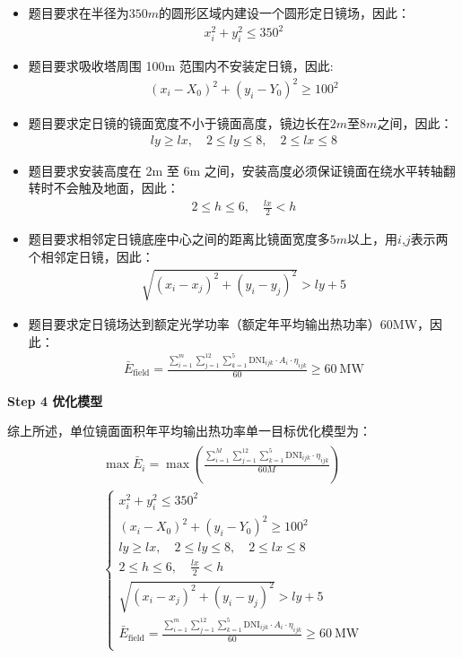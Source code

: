\documentclass[../main.tex]{subfiles}
\begin{document}
\begin{itemize}
    \item 题目要求在半径为$350m$的圆形区域内建设一个圆形定日镜场，因此：
  \begin{align}\label{2.3}
x_i^2 + y_i^2 \leq 350^2
  \end{align}
    \item 题目要求吸收塔周围 100m 范围内不安装定日镜，因此:
      \begin{align}\label{2.4}
(x_i - X_0)^2 + (y_i - Y_0)^2 \geq 100^2
  \end{align}
    \item 题目要求定日镜的镜面宽度不小于镜面高度，镜边长在$2m$至$8m$之间，因此：
      \begin{align}\label{2.5}
ly \geq lx, \quad 2 \leq ly \leq 8, \quad 2 \leq lx \leq 8
  \end{align}
    \item 题目要求安装高度在 2m 至 6m 之间，安装高度必须保证镜面在绕水平转轴翻转时不会触及地面，因此：     
     \begin{align}\label{2.6}
2 \leq h \leq 6, \quad \frac{lx}{2} < h
  \end{align}
    \item 题目要求相邻定日镜底座中心之间的距离比镜面宽度多$5m$以上，用$i$,$j$表示两个相邻定日镜，因此：     
      \begin{align}\label{2.7}
\sqrt{(x_i - x_j)^2 + (y_i - y_j)^2} > ly + 5
  \end{align}
\item 题目要求定日镜场达到额定光学功率（额定年平均输出热功率）60MW，因此：       
 \begin{align}\label{2.8}
\bar{E}_{\text{field}} = \frac{\sum_{i=1}^{m} \sum_{j=1}^{12} \sum_{k=1}^{5} \text{DNI}_{ijk} \cdot A_i \cdot \eta_{ijk}}{60} \geq 60\ \text{MW}
  \end{align}
 
\end{itemize}
\noindent \textbf{Step 4 优化模型}
\par 综上所述，单位镜面面积年平均输出热功率单一目标优化模型为：
  \begin{align}\label{2.9}
\begin{array}{c}
	\max \bar{E}_i = \max\left( \frac{\sum_{i=1}^{M} \sum_{j=1}^{12} \sum_{k=1}^{5} \text{DNI}_{ijk} \cdot \eta_{ijk}}{60M} \right)
\\
	\left\{ \begin{array}{l}
    x_i^2 + y_i^2 \leq 350^2\\
	(x_i - X_0)^2 + (y_i - Y_0)^2 \geq 100^2\\
	ly \geq lx, \quad 2 \leq ly \leq 8, \quad 2 \leq lx \leq 8\\
	2 \leq h \leq 6, \quad \frac{lx}{2} < h\\
	\sqrt{(x_i - x_j)^2 + (y_i - y_j)^2} > ly + 5\\
	\bar{E}_{\text{field}} = \frac{\sum_{i=1}^{m} \sum_{j=1}^{12} \sum_{k=1}^{5} \text{DNI}_{ijk} \cdot A_i \cdot \eta_{ijk}}{60} \geq 60\ \text{MW}\\
\end{array} \right.\\
\end{array}
  \end{align}
\end{document}
